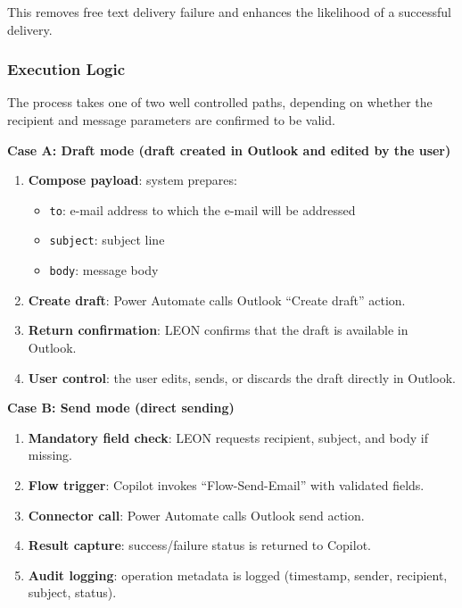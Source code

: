 \noindent This removes free text delivery failure and enhances the likelihood of a successful delivery.

\subsubsection{Execution Logic}

The process takes one of two well controlled paths, depending on whether the recipient and message parameters are confirmed to be valid.

\noindent\textbf{Case A: Draft mode (draft created in Outlook and edited by the user)}

\begin{enumerate}
    \item \textbf{Compose payload}: system prepares:
    \begin{itemize}
        \item \texttt{to}: e-mail address to which the e-mail will be addressed 
        \item \texttt{subject}: subject line
        \item \texttt{body}: message body
    \end{itemize}
    \item \textbf{Create draft}: Power Automate calls Outlook ``Create draft'' action.
    \item \textbf{Return confirmation}: LEON confirms that the draft is available in Outlook.
    \item \textbf{User control}: the user edits, sends, or discards the draft directly in Outlook.
\end{enumerate}

\noindent\textbf{Case B: Send mode (direct sending)}

\begin{enumerate}
    \item \textbf{Mandatory field check}: LEON requests recipient, subject, and body if missing.
    \item \textbf{Flow trigger}: Copilot invokes ``Flow-Send-Email'' with validated fields.
    \item \textbf{Connector call}: Power Automate calls Outlook send action.
    \item \textbf{Result capture}: success/failure status is returned to Copilot.
    \item \textbf{Audit logging}: operation metadata is logged (timestamp, sender, recipient, subject, status).
\end{enumerate}

